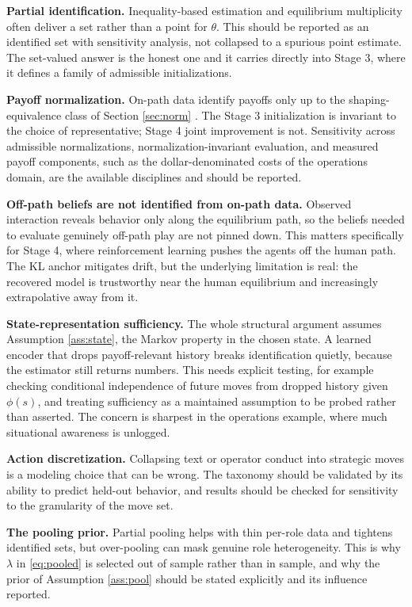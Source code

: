 \documentclass[11pt]{article}
\theoremstyle{definition}
\begin{document}
\textbf{Partial identification.} Inequality-based estimation and equilibrium multiplicity often deliver a set rather than a point for $\theta$. This should be reported as an identified set with sensitivity analysis, not collapsed to a spurious point estimate. The set-valued answer is the honest one and it carries directly into Stage 3, where it defines a family of admissible initializations.

\textbf{Payoff normalization.} On-path data identify payoffs only up to the shaping-equivalence class of Section \ref{sec:norm} \citep{magnacThesmar2002, kss2021, aguirregabiriaSuzuki2014}. The Stage 3 initialization is invariant to the choice of representative; Stage 4 joint improvement is not. Sensitivity across admissible normalizations, normalization-invariant evaluation, and measured payoff components, such as the dollar-denominated costs of the operations domain, are the available disciplines and should be reported.

\textbf{Off-path beliefs are not identified from on-path data.} Observed interaction reveals behavior only along the equilibrium path, so the beliefs needed to evaluate genuinely off-path play are not pinned down. This matters specifically for Stage 4, where reinforcement learning pushes the agents off the human path. The KL anchor mitigates drift, but the underlying limitation is real: the recovered model is trustworthy near the human equilibrium and increasingly extrapolative away from it.

\textbf{State-representation sufficiency.} The whole structural argument assumes Assumption \ref{ass:state}, the Markov property in the chosen state. A learned encoder that drops payoff-relevant history breaks identification quietly, because the estimator still returns numbers. This needs explicit testing, for example checking conditional independence of future moves from dropped history given $\phi(s)$, and treating sufficiency as a maintained assumption to be probed rather than asserted. The concern is sharpest in the operations example, where much situational awareness is unlogged.

\textbf{Action discretization.} Collapsing text or operator conduct into strategic moves is a modeling choice that can be wrong. The taxonomy should be validated by its ability to predict held-out behavior, and results should be checked for sensitivity to the granularity of the move set.

\textbf{The pooling prior.} Partial pooling helps with thin per-role data and tightens identified sets, but over-pooling can mask genuine role heterogeneity. This is why $\lambda$ in \eqref{eq:pooled} is selected out of sample rather than in sample, and why the prior of Assumption \ref{ass:pool} should be stated explicitly and its influence reported.
\end{document}
